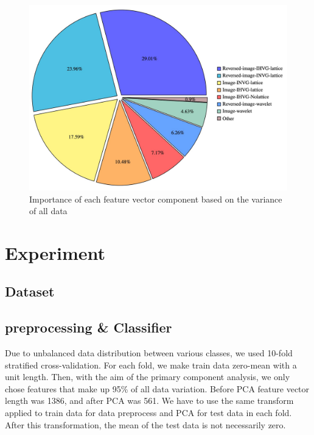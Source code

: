 \documentclass[conference]{IEEEtran}
\begin{document}
\begin{figure}[h]
  \includegraphics[width=1\linewidth]{PCA_piechart.png}
      \caption{Importance of each feature vector component based on the variance of all data}
  \label{fig: PCA1}
\end{figure}





\section{Experiment}
\subsection{\textbf{Dataset}}
\subsection{\textbf{preprocessing \& Classifier}}

Due to unbalanced data distribution between various classes, we used 10-fold stratified cross-validation. For each fold, we make train data zero-mean with a unit length. Then, with the aim of the primary component analysis, we only chose features that make up 95\% of all data variation. Before PCA feature vector length was 1386, and after PCA was 561. We have to use the same transform applied to train data for data preprocess and PCA for test data in each fold. After this transformation, the mean of the test data is not necessarily zero.
\end{document}
